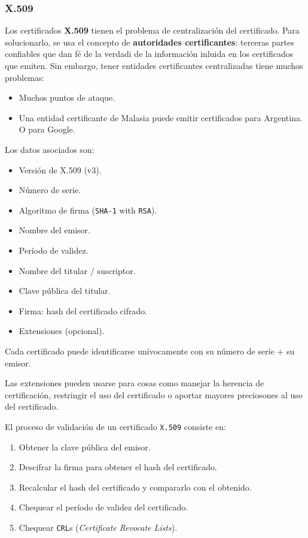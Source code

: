 \subsubsection{X.509}
Los certificados \textbf{X.509} tienen el problema de centralización del certificado. Para solucionarlo, se usa el concepto de \textbf{autoridades certificantes}: terceras partes confiables que dan fé de la verdadi de la información inluida en los certificados que emiten. Sin embargo, tener entidades certificantes centralizadas tiene muchos problemas:
\begin{itemize}
	\item Muchos puntos de ataque.
	\item Una entidad certificante de Malasia puede emitir certificados para Argentina. O para Google.
\end{itemize}

Los datos asociados son:
\begin{itemize}
	\item Versión de X.509 (v3).
	\item Número de serie.
	\item Algoritmo de firma (\texttt{SHA-1} with \texttt{RSA}).
	\item Nombre del emisor.
	\item Período de validez.
	\item Nombre del titular / suscriptor.
	\item Clave pública del titular.
	\item Firma: hash del certificado cifrado.
	\item Extensiones (opcional).
\end{itemize}

Cada certificado puede identificarse unívocamente con su número de seríe + su emisor.

Las extensiones pueden usarse para cosas como manejar la herencia de certificación, restringir el uso del certificado o aportar mayores preciosones al uso del certificado.



El proceso de validación de un certificado \texttt{X.509} consiste en:
\begin{enumerate}
	\item Obtener la clave pública del emisor.
	\item Descifrar la firma para obtener el hash del certificado.
	\item Recalcular el hash del certificado y compararlo con el obtenido.
	\item Chequear el período de validez del certificado.
	\item Chequear \texttt{CRL}s (\emph{Certificate Revocate Lists}).
\end{enumerate}


